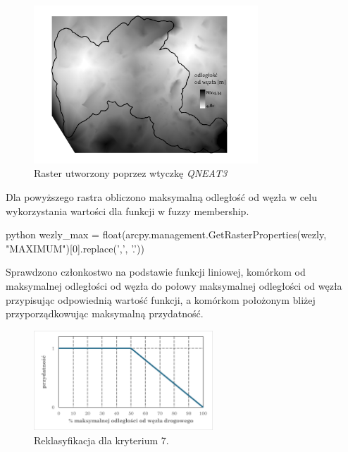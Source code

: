 \documentclass{article}
\begin{document}
\begin{figure}[H]
    \centering
    \includegraphics[width=0.75\textwidth]{img/kryterium7-wezly.jpg}
    \caption{Raster utworzony poprzez wtyczkę \textit{QNEAT3}}
\end{figure}
\vspace{10pt}

Dla powyższego rastra obliczono maksymalną odległość od węzła w celu wykorzystania wartości dla funkcji w fuzzy membership.
\vspace{5pt}

\begin{mintedbox}{python}
wezly_max = float(arcpy.management.GetRasterProperties(wezly, "MAXIMUM")[0].replace(',', '.'))
\end{mintedbox}
\vspace{10pt}

Sprawdzono członkostwo na podstawie funkcji liniowej, komórkom od maksymalnej odległości od węzła do połowy maksymalnej odległości od węzła przypisując odpowiednią wartość funkcji, a komórkom położonym bliżej przyporządkowując maksymalną przydatność. 
\vspace{5pt}

\begin{figure}[H]
    \centering
    \includegraphics[width=0.6\textwidth]{img/kryterium7-wykres-glowny.png}
    \caption{Reklasyfikacja dla kryterium 7.}
\end{figure}
\vspace{10pt}
\end{document}
